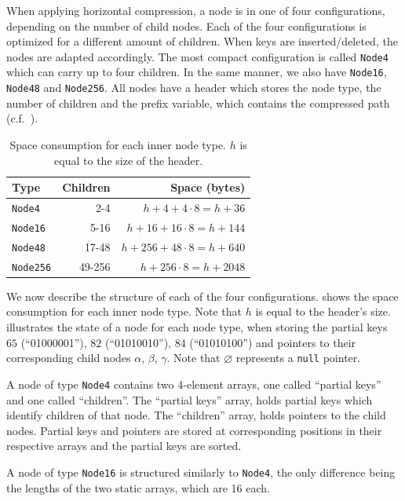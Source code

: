 \documentclass[abstracton,12pt]{scrartcl}
\theoremstyle{definition}
\begin{document}
When applying horizontal compression, a node is in one of four configurations, 
depending on the number of child nodes. Each of the four configurations is 
optimized for a different amount of children.
When keys are inserted/deleted, the nodes are adapted accordingly.
The most compact configuration 
is called \texttt{Node4} which can carry up to four children. 
In the same manner, we also have \texttt{Node16}, \texttt{Node48} 
and \texttt{Node256}. All nodes have a header which stores the node type,
the number of children and the prefix variable, which contains the compressed
path (c.f.\ ).

\begin{table}[h]
  \centering
  \begin{tabular}{ l|r|r } 
    Type & Children & Space (bytes) \\
    \hline
    \texttt{Node4} & 2-4 & $h + 4 + 4 \cdot 8 = h + 36$ \\ 
    \texttt{Node16} & 5-16 & $h + 16 + 16 \cdot 8 = h + 144$ \\ 
    \texttt{Node48} & 17-48 & $h + 256 + 48 \cdot 8 = h + 640$ \\ 
    \texttt{Node256} & 49-256 & $h + 256 \cdot 8 = h + 2048$ 
  \end{tabular}
  \caption{Space consumption for each inner node type. $h$ is equal to
    the size of the header.}
  \label{tbl:node-sizes}
\end{table}

We now describe the structure of each of the four configurations.
 shows the space consumption for each inner node type.
Note that $h$ is equal to the header's size.
 illustrates the state of a node
for each node type, when storing the partial keys $65$ (``01000001''), 
$82$ (``01010010''), $84$ (``01010100'') and pointers to their corresponding 
child nodes $\alpha$, $\beta$, $\gamma$. Note that $\varnothing$ represents 
a \texttt{null} pointer.

A node of type \texttt{Node4} contains two 4-element arrays, one called
``partial keys'' and one called ``children''.
The ``partial keys'' array, holds
partial keys which identify children of that node. 
The ``children'' array, holds pointers to the child nodes.
Partial keys and pointers are stored at corresponding positions in their
respective arrays and the partial keys are sorted.

A node of type \texttt{Node16} is structured similarly
to \texttt{Node4}, the only difference being the lengths of the two static 
arrays, which are 16 each.
\end{document}
